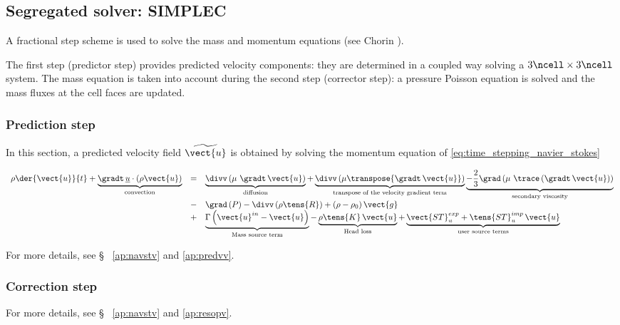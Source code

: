 \subsection{Segregated solver: SIMPLEC}
A fractional step scheme is used to solve the mass and momentum equations
(see Chorin \cite{Chorin:1968}). 

The first step (predictor step) provides predicted velocity
components: they are determined in a coupled way solving a $3 \ncell \times 3 \ncell $ system. 
The mass equation is taken into account during the second step
(corrector step): a pressure Poisson equation is solved and the mass fluxes
at the cell faces are updated.

\subsubsection{Prediction step}
In this section, a predicted velocity field $ \widetilde{\vect{u}} $ is obtained by solving 
the momentum equation of \eqref{eq:time_stepping_navier_stokes}

\begin{equation}
\begin{array}{rcl}
\displaystyle \rho \der{ \vect {u} } { t} 
+
\underbrace {
\gradt \,  \underline{u} \cdot \left( \rho\vect{u} \right)
}_{
\text{convection}
}%
&= & \underbrace{
\divv \left(\mu\ \gradt \, \vect{u} \right)
}_{
\text{diffusion}
}%
 + 
\underbrace{
\divv \left( \mu \transpose{\gradt \, \vect{u}} \right)
}_{
\text{transpose of the velocity gradient term}
}%
\underbrace{ 
-  \frac{2}{3} \grad \left( \mu\ \trace \left( \gradt \, \vect{u}  \right) \right)
}_{
\text{secondary viscosity}
}%
\\
 &-& \grad \left( P \right)
 - \divv \left( \rho \tens{R} \right)
 + \left( \rho -\rho_0 \right) \vect{g} \\
&\displaystyle +&
\underbrace{
\Gamma \left( \vect{u}^{in}-\vect{u} \right)
}_{
\text{Mass source term}
}%
- 
\underbrace{
\rho \tens{K} \, \vect{u}
}_{
\text{Head loss}
}%
 + 
\underbrace{ 
\vect{ST}_{u}^{exp}+ \tens{ST}_{u}^{imp}\, \vect{u}
}_{
\text{user source terms}
}%
\end{array}
\end{equation}

For more details, see \S~ \ref{ap:navstv} and \ref{ap:predvv}. 
\subsubsection{Correction step}

For more details, see \S~ \ref{ap:navstv} and \ref{ap:resopv}. 



